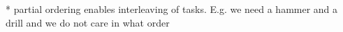 
* partial ordering enables interleaving of tasks. E.g. we need a hammer and a drill and we do not care in what order